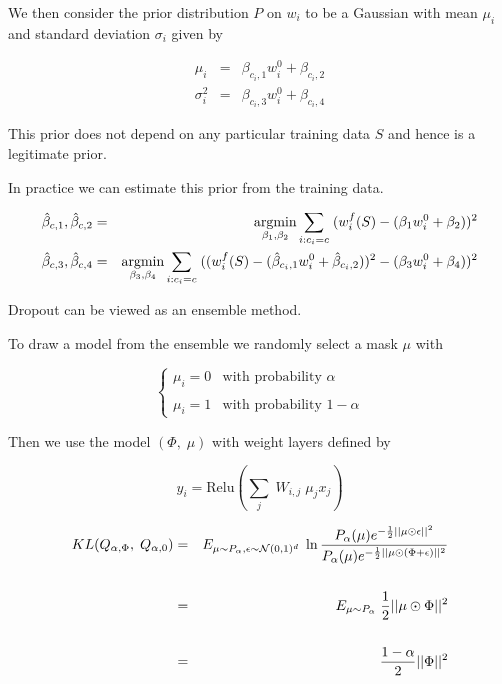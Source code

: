 {{We then consider the prior distribution $P$ on $w_i$ to be a Gaussian with mean $\mu_i$ and standard deviation $\sigma_i$ given by

\begin{eqnarray*}
  \mu_i & = & \beta_{c_i,1}w_i^0 + \beta_{c_i,2} \\
  \sigma_i^2 & = & \beta_{c_i,3}w_i^0 + \beta_{c_i,4}
\end{eqnarray*}


This prior does not depend on any particular training data $S$ and hence is a legitimate prior.

\vfill
In practice we can estimate this prior from the training data.

\begin{eqnarray*}
\hat{\beta}_{c,1},\hat{\beta}_{c,2} & = & \operatorname*{argmin}_{\beta_1,\beta_2} \sum_{i: c_i = c}\;(w_i^f(S) - (\beta_1 w_i^0 + \beta_2))^2 \\
\hat{\beta}_{c,3},\hat{\beta}_{c,4} &  = & \operatorname*{argmin}_{\beta_3,\beta_4} \sum_{i: c_i = c}\;((w_i^f(S) - (\hat{\beta}_{c_i,1} w_i^0 + \hat{\beta}_{c_i,2}))^2 - (\beta_3 w_i^0 + \beta_4))^2
\end{eqnarray*}
}


Dropout can be viewed as an ensemble method.


\vfill
To draw a model from the ensemble we randomly select a mask $\mu$ with

$$\left\{\begin{array}{ll} \mu_i = 0 & \mbox{with probability $\alpha$} \\ \\ \mu_i = 1 & \mbox{with probability $1-\alpha$}
\end{array}\right.$$

\vfill
Then we use the model $(\Phi,\;\mu)$ with weight layers defined by


\vfill
$$y_i = \mathrm{Relu}\left(\sum_j\;W_{i,j} \;\mu_jx_j\right)$$


\begin{eqnarray*}
KL(Q_{\alpha,\Phi},\;Q_{\alpha,0}) & = & E_{\mu \sim P_\alpha, \epsilon \sim {\cal N}(0,1)^d}\;\ln \frac{P_\alpha(\mu) e^{-\frac{1}{2}||\mu \odot \epsilon||^2}}{P_\alpha(\mu) e^{-\frac{1}{2}||\mu \odot (\Phi + \epsilon)||^2}} \\
\\
& = & E_{\mu \sim P_\alpha}\;\frac{1}{2}||\mu \odot \Phi||^2 \\
\\
& = & \frac{1-\alpha}{2}||\Phi||^2
\end{eqnarray*}

}
